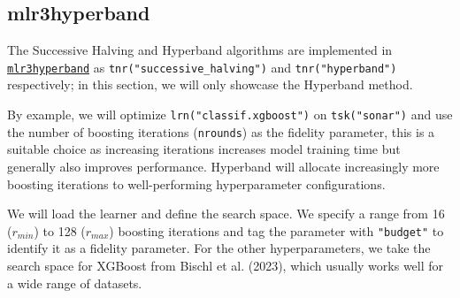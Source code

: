 \hypertarget{mlr3hyperband}{%
\subsection{mlr3hyperband}\label{mlr3hyperband}}

The Successive Halving and Hyperband algorithms are implemented in
\href{https://mlr3hyperband.mlr-org.com}{\texttt{mlr3hyperband}}
as \texttt{tnr("successive\_halving")} and \texttt{tnr("hyperband")}
respectively; in this section, we will only showcase the Hyperband
method.

By example, we will optimize \texttt{lrn("classif.xgboost")} on
\texttt{tsk("sonar")} and use the number of boosting iterations
(\texttt{nrounds}) as the fidelity parameter, this is a suitable choice
as increasing iterations increases model training time but generally
also improves performance. Hyperband will allocate increasingly more
boosting iterations to well-performing hyperparameter configurations.

We will load the learner and define the search space. We specify a range
from 16 (\(r_{min}\)) to 128 (\(r_{max}\)) boosting iterations and tag
the parameter with \texttt{"budget"} to identify it as a fidelity
parameter. For the other hyperparameters, we take the search space for
XGBoost from Bischl et al. (2023), which usually works well for a wide
range of datasets.

\begin{Shaded}
\begin{Highlighting}[]

\OtherTok{=} \NormalTok{(}\NormalTok{)}
\SpecialCharTok{$}\SpecialCharTok{$}\NormalTok{(}
   \NormalTok{(}\NormalTok{(}\NormalTok{, }\NormalTok{, } \NormalTok{)),}
   \NormalTok{(}\NormalTok{, }\NormalTok{, } \NormalTok{),}
   \NormalTok{(}\NormalTok{, }\NormalTok{),}
   \NormalTok{(}\NormalTok{, }\NormalTok{),}
   \NormalTok{(}\NormalTok{, }\NormalTok{),}
   \NormalTok{(}\NormalTok{, }\NormalTok{, } \NormalTok{),}
   \NormalTok{(}\NormalTok{, }\NormalTok{, } \NormalTok{),}
   \NormalTok{(}\NormalTok{, }\NormalTok{)}
\NormalTok{)}
\end{Highlighting}
\end{Shaded}

